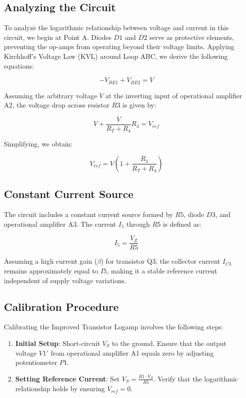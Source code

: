 \subsection{Analyzing the Circuit}
To analyze the logarithmic relationship between voltage and current in this circuit, we begin at Point A. Diodes \( D1 \) and \( D2 \) serve as protective elements, preventing the op-amps from operating beyond their voltage limits. Applying Kirchhoff's Voltage Law (KVL) around Loop ABC, we derive the following equations:

\[
- V_{BE1} + V_{BE2} = V
\]

Assuming the arbitrary voltage \( V \) at the inverting input of operational amplifier A2, the voltage drop across resistor \( R3 \) is given by:

\[
V + \frac{V}{R_T + R_4} R_3 = V_{ref}
\]

Simplifying, we obtain:

\[
V_{ref} = V \left(1 + \frac{R_3}{R_T + R_4}\right)
\]

\subsection{Constant Current Source}
The circuit includes a constant current source formed by \( R5 \), diode \( D3 \), and operational amplifier A3. The current \( I_5 \) through \( R5 \) is defined as:

\[
I_5 = \frac{V_Z}{R5}
\]

Assuming a high current gain (\( \beta \)) for transistor Q3, the collector current \( I_{C3} \) remains approximately equal to \( I5 \), making it a stable reference current independent of supply voltage variations.

\subsection{Calibration Procedure}
Calibrating the Improved Transistor Logamp involves the following steps:

\begin{enumerate}
    \item \textbf{Initial Setup}: Short-circuit \( V_S \) to the ground. Ensure that the output voltage \( V1' \) from operational amplifier A1 equals zero by adjusting potentiometer \( P1 \).
    \item \textbf{Setting Reference Current}: Set \( V_S = \frac{R1 \cdot V_Z}{R5} \). Verify that the logarithmic relationship holds by ensuring \( V_{ref} = 0 \).
\end{enumerate}


